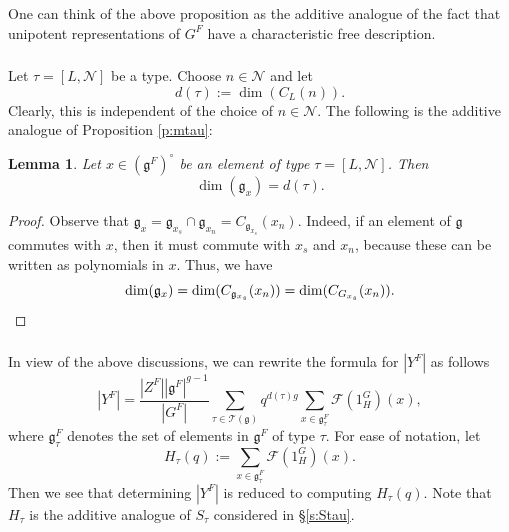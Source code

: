 \documentclass[12pt]{amsart}
\theoremstyle{plain}
\newtheorem{lem}[thm]{Lemma}
\theoremstyle{definition}
\theoremstyle{remark}
\newcommand{\bY}{{Y}}
\newcommand{\cT}{\mathcal{T}}
\newcommand{\cN}{\mathcal{N}}
\newcommand{\fg}{\mathfrak{g}}
\begin{document}
One can think of the above proposition as the additive analogue of the fact that unipotent representations of $G^F$ have a characteristic free description. 



\subsubsection{} Let $\tau=[L,\cN]$ be a type. Choose $n\in \cN$ and let 
\[
d(\tau):=\dim(C_L(n)). 
\] 
Clearly, this is independent of the choice of $n\in \cN$.  The following is the additive analogue of Proposition  \ref{p:mtau}:
\begin{lem} Let  $x\in (\fg^F)^\circ$ be an element of type $\tau=[L,\cN]$. Then 
\[
\dim(\fg_x)=d(\tau). 
\]
\end{lem} 

\begin{proof} 
Observe that
$\fg_{x} = \fg_{x_s}\cap \fg_{x_n} = C_{\fg_{x_s}}(x_n)$. Indeed, if an element of $\fg$ commutes with $x$, then it must commute with $x_s$ and $x_n$, because these can be written as polynomials in $x$. 
Thus, we have
\[
\dim(\fg_x)=\dim(C_{\fg_{x_s}}(x_n)) = \dim(C_{G_{x_s}}(x_n)). \qedhere
\]
\end{proof} 


\subsubsection{} In view of the above discussions, we can rewrite the formula for $|\bY^F|$ as follows
 \[
|\bY^F| = \frac{|Z^F||\fg^F|^{g-1}}{|G^F|} \sum_{\tau\in \cT(\fg)} q^{d(\tau)g} \sum_{x \in \fg^F_\tau} \mathcal{F}(1_{H}^G)(x),
\] 
where $\fg^F_\tau$ denotes the set of elements in $\fg^F$ of type $\tau$. 
For ease of notation, let 
\[
\boxed{
H_\tau(q):= \displaystyle \sum_{x \in \fg^F_\tau} \mathcal{F}(1_{H}^G)(x). 
}
\]
Then we see that determining $|\bY^F|$ is reduced to computing $H_\tau(q)$. Note that $H_\tau$ is the additive analogue of $S_\tau$ considered in \S \ref{s:Stau}. 
\end{document}
